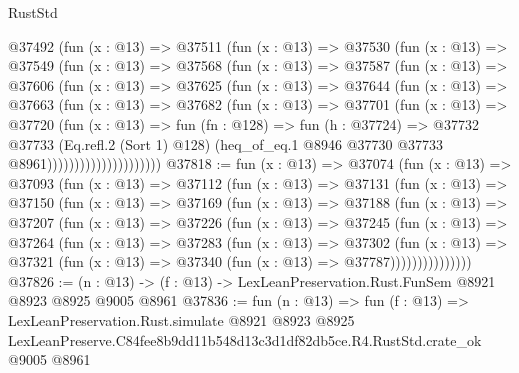 \begin{lexlean}{RustStd}
\begin{coremodule}
                @37492
                  (fun (x : @13) =>
                  @37511
                    (fun (x : @13) =>
                    @37530
                      (fun (x : @13) =>
                      @37549
                        (fun (x : @13) =>
                        @37568
                          (fun (x : @13) =>
                          @37587
                            (fun (x : @13) =>
                            @37606
                              (fun (x : @13) =>
                              @37625
                                (fun (x : @13) =>
                                @37644
                                  (fun (x : @13) =>
                                  @37663
                                    (fun (x : @13) =>
                                    @37682
                                      (fun (x : @13) =>
                                      @37701
                                        (fun (x : @13) =>
                                        @37720
                                          (fun (x : @13) =>
                                          fun (fn : @128) =>
                                          fun (h : @37724) =>
                                          @37732
                                            @37733
                                            (Eq.refl.{2} (Sort 1) @128)
                                            (heq_of_eq.{1}
                                              @8946
                                              @37730
                                              @37733
                                              @8961)))))))))))))))))))))
@37818 := fun (x : @13) =>
  @37074
    (fun (x : @13) =>
    @37093
      (fun (x : @13) =>
      @37112
        (fun (x : @13) =>
        @37131
          (fun (x : @13) =>
          @37150
            (fun (x : @13) =>
            @37169
              (fun (x : @13) =>
              @37188
                (fun (x : @13) =>
                @37207
                  (fun (x : @13) =>
                  @37226
                    (fun (x : @13) =>
                    @37245
                      (fun (x : @13) =>
                      @37264
                        (fun (x : @13) =>
                        @37283
                          (fun (x : @13) =>
                          @37302
                            (fun (x : @13) =>
                            @37321 (fun (x : @13) => @37340 (fun (x : @13) => @37787)))))))))))))))
@37826 := (n : @13) -> (f : @13) -> LexLeanPreservation.Rust.FunSem @8921 @8923 @8925 @9005 @8961
@37836 := fun (n : @13) =>
  fun (f : @13) =>
  LexLeanPreservation.Rust.simulate
    @8921
    @8923
    @8925
    LexLeanPreserve.C84fee8b9dd11b548d13c3d1df82db5ce.R4.RustStd.crate_ok
    @9005
    @8961
\end{coremodule}
\end{lexlean}
